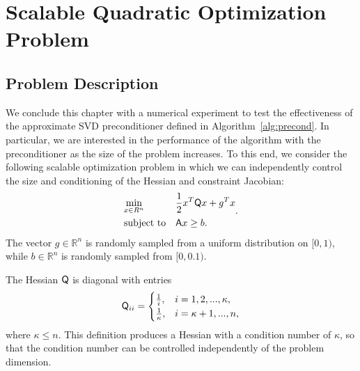 \newpage
\section{Scalable Quadratic Optimization Problem}
\subsection{Problem Description}
We conclude this chapter with a numerical experiment to test the effectiveness of the approximate SVD
preconditioner defined in Algorithm~\ref{alg:precond}.  In particular, we are
interested in the performance of the algorithm with the preconditioner as the size of the problem increases.  
To this end, we consider the following scalable optimization problem
in which we can independently control the size and conditioning of the Hessian
and constraint Jacobian:
\begin{equation}\label{eq:quadra}
  \begin{aligned}
    &\underset{x \in R^n} {\text{min}}  
    & & \frac{1}{2}x^T \mathsf{Q} x + g^T x \\
    &\text{subject to} & & \mathsf{A}x \geq b.  \\
  \end{aligned}.
\end{equation}
The vector $g\in \mathbb{R}^{n}$ is randomly sampled from a uniform distribution 
on $[ 0,1)$, while $b \in \mathbb{R}^{n}$ is randomly sampled from $[0,0.1)$. 

The Hessian $\mathsf{Q}$ is diagonal with entries
\begin{equation*}
  \mathsf{Q}_{ii} = \begin{cases}
    \frac{1}{i}, &  i = 1, 2, ...,  \kappa, \\
    \frac{1}{\kappa}, & i =  \kappa+1, ... , n, \\
  \end{cases}
\end{equation*}
where $\kappa \leq n$.  This definition produces a Hessian with a condition
number of $\kappa$,  so that the condition number 
can be controlled independently of the problem dimension.

